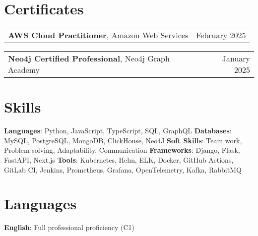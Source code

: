 \documentclass[letterpaper,11pt]{article}
\makeatletter
\newcommand{\titleWithDescription}[2]{\textbf{#1}{: #2}}
\newcommand{\resumeLanguages}[2]{
  \section{Languages}
    \noindent
    \titleWithDescription{#1}{#2}
}
\newcommand{\certificateItem}[3]{
  \begin{tabular*}{1\textwidth}{l@{\extracolsep{\fill}}r}
    \small{
      \textbf{#1}{, #2}
    } & \small #3 \\
  \end{tabular*}\vspace{-12px}
}
\makeatother
\begin{document}
\section{Certificates}

    \certificateItem
      {AWS Cloud Practitioner}
      {Amazon Web Services}
      {February 2025}\vspace{3px}

    \certificateItem
      {Neo4j Certified Professional}
      {Neo4j Graph Academy}
      {January 2025}

%
\section{Skills}

  \titleWithDescription{Languages}{Python, JavaScript, TypeScript, SQL, GraphQL}\vspace{3pt}
  \hfill
  \titleWithDescription{Databases}{MySQL, PostgreSQL, MongoDB, ClickHouse, Neo4J}
  \newline
  \titleWithDescription{Soft Skills}{Team work, Problem-solving, Adaptability, Communication}
  \hfill
  \titleWithDescription{Frameworks}{Django, Flask, FastAPI, Next.js}\vspace{3pt}
  \newline
  \titleWithDescription{Tools}{Kubernetes, Helm, ELK, Docker, GitHub Actions, GitLab CI, Jenkins, Prometheus, Grafana, OpenTelemetry, Kafka, RabbitMQ}
\resumeLanguages
  {English}
  {Full professional proficiency (C1)}
\end{document}
